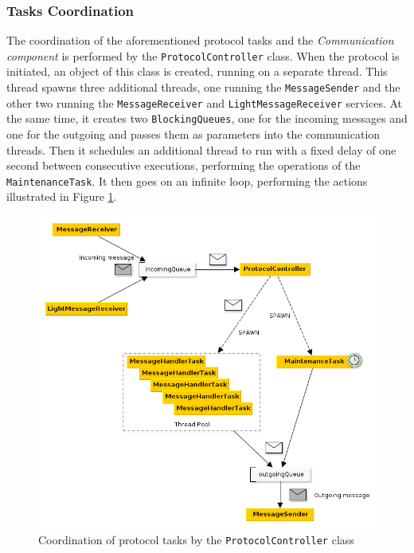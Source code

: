 \documentclass[a4paper,11pt,twoside]{report}
\newcommand{\classname}[1]{\texttt{#1}}
\begin{document}
\subsubsection*{Tasks Coordination}

The coordination of the aforementioned protocol tasks and the \textit{Communication component} is performed by the \classname{ProtocolController} class. When the protocol is initiated, an object of this class is created, running on a separate thread. This thread spawns three additional threads, one running the \classname{MessageSender} and the other two running the \classname{MessageReceiver} and \classname{LightMessageReceiver} services. At the same time, it creates two \classname{BlockingQueues}, one for the incoming messages and one for the outgoing and passes them as parameters into the communication threads. Then it schedules an additional thread to run with a fixed delay of one second between consecutive executions, performing the operations of the \classname{MaintenanceTask}. It then goes on an infinite loop, performing the actions illustrated in Figure \ref{fig:protocol_controller}. 

\begin{figure} [H]
   \centering
    \includegraphics[scale=0.5]{../figures/protocol_controller.png}
     \caption{Coordination of protocol tasks by the \classname{ProtocolController} class}
     \label{fig:protocol_controller}
\end{figure}
\end{document}
